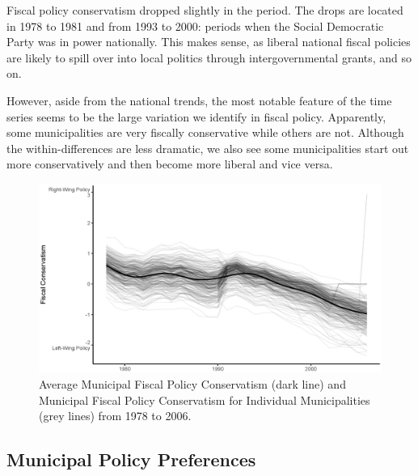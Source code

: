 \documentclass[a4paper,12pt]{article}
\begin{document}
Fiscal policy conservatism dropped slightly in the period. The drops are located in 1978 to 1981 and from 1993 to 2000: periods when the Social Democratic Party was in power nationally. This makes sense, as liberal national fiscal policies are likely to spill over into local politics through intergovernmental grants, and so on.

However, aside from the national trends, the most notable feature of the time series seems to be the large variation we identify in fiscal policy. Apparently, some municipalities are very fiscally conservative while others are not. Although the within-differences are less dramatic, we also see some municipalities start out more conservatively and then become more liberal and vice versa.

\begin{figure}[htbp]
	\centering 
	
	\includegraphics[width=1\textwidth]{fiscal_TimeSeries.eps}
	\caption{Average Municipal Fiscal Policy Conservatism (dark line) and Municipal Fiscal Policy Conservatism for Individual Municipalities (grey lines) from 1978 to 2006.}
	\label{fig:timeline}
	

	
\end{figure}


\subsection*{Municipal Policy Preferences}
\end{document}
